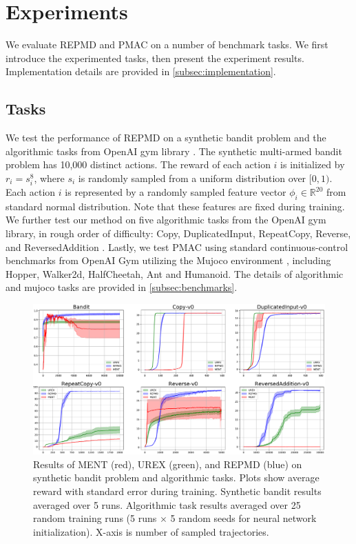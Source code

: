 
\section{Experiments}
\label{sec:experiments}

We evaluate REPMD and PMAC on a number of benchmark tasks. We first introduce the experimented tasks, then present the experiment results. Implementation details are provided in \cref{subsec:implementation}. 

\subsection{Tasks}
\label{subsec:tasks}
We test the performance of REPMD on a synthetic bandit problem and the algorithmic tasks from OpenAI gym library \citep{brockman2016openai}. The synthetic multi-armed bandit problem has 10,000 distinct actions. The reward of each action $i$ is initialized by $r_i = s_i^{8}$, where $s_i$ is randomly sampled from a uniform distribution over $[0,1)$. Each action $i$ is represented by a randomly sampled feature vector $\phi_i\in \mathbb{R}^{20}$ from standard normal distribution. Note that these features are fixed during training. We further test our method on five algorithmic tasks from the OpenAI gym library, in rough order of difficulty: Copy, DuplicatedInput, RepeatCopy, Reverse, and ReversedAddition \citep{brockman2016openai}. Lastly, we test PMAC using standard continuous-control benchmarks from OpenAI Gym utilizing the Mujoco environment \citep{brockman2016openai,todorov2012mujoco}, including Hopper, Walker2d, HalfCheetah, Ant and Humanoid. The details of algorithmic and mujoco tasks are provided in \cref{subsec:benchmarks}. 

\begin{figure}[t]
\begin{center}
\includegraphics[width=0.75\linewidth]{./fig1.pdf}
\end{center}
\caption{
Results of MENT (red), UREX (green), and REPMD (blue) on synthetic bandit problem and algorithmic tasks. Plots show average reward with standard error during training. Synthetic bandit results averaged over 5 runs. Algorithmic task results averaged over 25 random training runs (5 runs $\times$ 5 random seeds for neural network initialization). X-axis is number of sampled trajectories. } 
\label{fig:results}
\end{figure}


